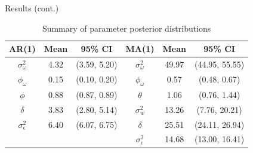 \documentclass{beamer}
\begin{document}
\begin{frame}{Results (cont.)}
\begin{table}[H]
\centering
\begin{tabular}{|c c c|c c c|}
\hline
AR(1) & Mean & 95\% CI & MA(1) & Mean & 95\% CI \\\hline
$\sigma_\omega^2$ & 4.32 & (3.59, 5.20) & $\sigma_\omega^2$ & 49.97 & (44.95, 55.55) \\
$\phi_\omega$ & 0.15 & (0.10, 0.20) & $\phi_\omega$ & 0.57 & (0.48, 0.67) \\
\hline
$\phi$ & 0.88 & (0.87, 0.89) & $\theta$ & 1.06 & (0.76, 1.44) \\
$\delta$ & 3.83 & (2.80, 5.14) & $\sigma_w^2$ & 13.26 & (7.76, 20.21) \\
$\sigma_\epsilon^2$ & 6.40 & (6.07, 6.75) & $\delta$ & 25.51 & (24.11, 26.94) \\
 &  &  & $\sigma_\epsilon^2$ & 14.68 & (13.00, 16.41) \\
\hline
\end{tabular}
\caption{Summary of parameter posterior distributions}
\end{table}
\end{frame}
\end{document}
